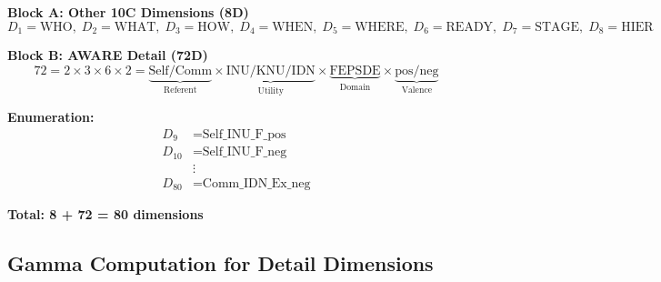\begin{tcolorbox}[colback=blue!5!white, colframe=blue!75!black,
    title=\textbf{EIT-EMP-1-D3: The 80D Awareness Intervention Space}]

\textbf{Block A: Other 10C Dimensions (8D)}
\begin{equation}
D_1 = \text{WHO}, \; D_2 = \text{WHAT}, \; D_3 = \text{HOW}, \; D_4 = \text{WHEN}, \; D_5 = \text{WHERE}, \; D_6 = \text{READY}, \; D_7 = \text{STAGE}, \; D_8 = \text{HIER}
\end{equation}

\textbf{Block B: AWARE Detail (72D)}
\begin{equation}
72 = 2 \times 3 \times 6 \times 2 = \underbrace{\text{Self/Comm}}_{\text{Referent}} \times \underbrace{\text{INU/KNU/IDN}}_{\text{Utility}} \times \underbrace{\text{FEPSDE}}_{\text{Domain}} \times \underbrace{\text{pos/neg}}_{\text{Valence}}
\end{equation}

\textbf{Enumeration:}
\begin{align*}
D_9 &= \text{Self\_INU\_F\_pos} \\
D_{10} &= \text{Self\_INU\_F\_neg} \\
&\vdots \\
D_{80} &= \text{Comm\_IDN\_Ex\_neg}
\end{align*}

\textbf{Total: 8 + 72 = 80 dimensions}

\end{tcolorbox}

\subsection{Gamma Computation for Detail Dimensions}
\label{subsec:emp1-computation}

